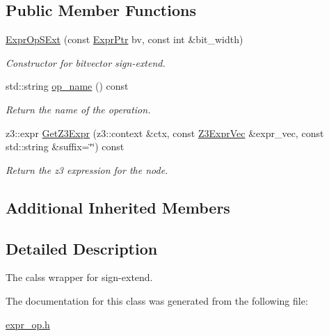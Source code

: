 \subsection*{Public Member Functions}
\begin{DoxyCompactItemize}
\item 
\mbox{\label{classilang_1_1_expr_op_s_ext_ad293dd01d21c5406e73e47bdf4f195e2}} 
\mbox{\hyperlink{classilang_1_1_expr_op_s_ext_ad293dd01d21c5406e73e47bdf4f195e2}{Expr\+Op\+S\+Ext}} (const \mbox{\hyperlink{classilang_1_1_expr_a85952b6a34620c4c8cab6bac9c9fdf8c}{Expr\+Ptr}} bv, const int \&bit\+\_\+width)
\begin{DoxyCompactList}\small\item\em Constructor for bitvector sign-\/extend. \end{DoxyCompactList}\item 
\mbox{\label{classilang_1_1_expr_op_s_ext_af1d5e4291623c11723e4a8d6f72cead3}} 
std\+::string \mbox{\hyperlink{classilang_1_1_expr_op_s_ext_af1d5e4291623c11723e4a8d6f72cead3}{op\+\_\+name}} () const
\begin{DoxyCompactList}\small\item\em Return the name of the operation. \end{DoxyCompactList}\item 
\mbox{\label{classilang_1_1_expr_op_s_ext_a4681a1209941f2ef8bb6c54c089348ca}} 
z3\+::expr \mbox{\hyperlink{classilang_1_1_expr_op_s_ext_a4681a1209941f2ef8bb6c54c089348ca}{Get\+Z3\+Expr}} (z3\+::context \&ctx, const \mbox{\hyperlink{namespaceilang_adc4eee919aa24fff882d03a48d733c19}{Z3\+Expr\+Vec}} \&expr\+\_\+vec, const std\+::string \&suffix=\char`\"{}\char`\"{}) const
\begin{DoxyCompactList}\small\item\em Return the z3 expression for the node. \end{DoxyCompactList}\end{DoxyCompactItemize}
\subsection*{Additional Inherited Members}


\subsection{Detailed Description}
The calss wrapper for sign-\/extend. 

The documentation for this class was generated from the following file\+:\begin{DoxyCompactItemize}
\item 
\mbox{\hyperlink{expr__op_8h}{expr\+\_\+op.\+h}}\end{DoxyCompactItemize}
